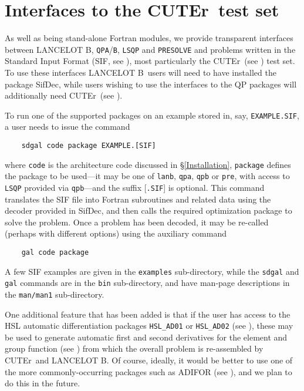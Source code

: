 \documentclass[twoside]{article}
\newcommand{\lanb}{{\sf LANCELOT B}}
\newcommand{\cuter}{{\sf CUTEr}}
\newcommand{\sifdec}{{\sf SifDec}}
\begin{document}
\section{Interfaces to the \cuter\ test set}

As well as being stand-alone Fortran modules, we provide transparent
interfaces between \lanb, {\tt QPA}/{\tt B}, {\tt LSQP} and {\tt PRESOLVE} and
problems written in the Standard Input Format (SIF, see
), most particularly
the \cuter\ (see ) test set. To use these
interfaces \lanb\ users will need to have installed the package
\sifdec, while users wishing to use the interfaces to the QP packages
will additionally need \cuter\ (see ).

To run one of the supported packages on an example stored in, say,
{\tt EXAMPLE.SIF}, a user needs to issue the command
\begin{verbatim}
    sdgal code package EXAMPLE.[SIF]
\end{verbatim}
where {\tt code} is the architecture code discussed in \S\ref{Installation},
{\tt package} defines the package to be used---it may be one of {\tt lanb},
{\tt qpa}, {\tt qpb} or {\tt pre}, with access to {\tt LSQP}
provided via {\tt qpb}---and the suffix [{\tt .SIF}] is optional.
This command translates the SIF file into Fortran subroutines and
related data using the decoder provided in \sifdec, and then calls
the required optimization package to solve the problem. Once a problem
has been decoded, it may be re-called (perhaps with different options)
using the auxiliary command
\begin{verbatim}
    gal code package
\end{verbatim}
A few SIF examples are given in the {\tt examples} sub-directory, while the
{\tt sdgal} and {\tt gal} commands are in the {\tt bin} sub-directory, and
have man-page descriptions in the {\tt man/man1} sub-directory.

One additional feature that has been added is that if the user has
access to the HSL automatic differentiation packages {\tt HSL\_AD01}
or {\tt HSL\_AD02} (see ),
these may be used to generate automatic first and second derivatives
for the element and group function (see )
from which the overall problem is re-assembled by \cuter\ and \lanb.
Of course, ideally, it would be better to use one of the more
commonly-occurring packages
such as  ADIFOR (see ),
and we plan to do this in the future.
\end{document}
